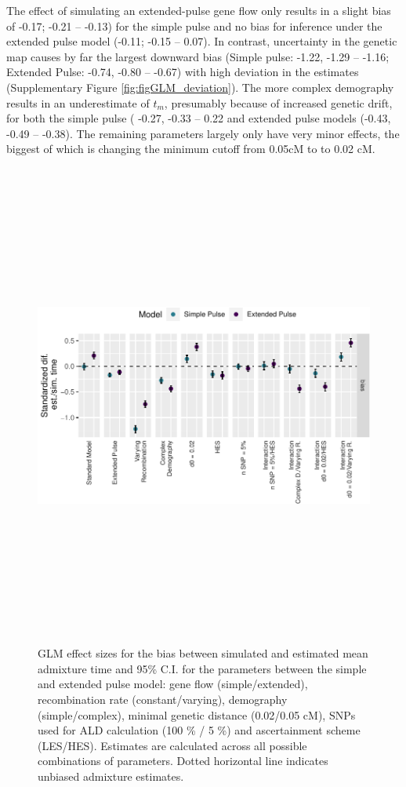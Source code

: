 \documentclass[11pt]{article}
\begin{document}
The effect of simulating an extended-pulse gene flow only results in a slight bias of -0.17; -0.21 -- -0.13) for the simple pulse and no bias for inference under the extended pulse model (-0.11; -0.15 -- 0.07). In contrast, uncertainty in the genetic map causes by far the largest downward bias (Simple pulse: -1.22, -1.29 -- -1.16; Extended Pulse: -0.74, -0.80 -- -0.67) with high deviation in the estimates (Supplementary Figure \ref{fig:figGLM_deviation}). The more complex demography results in an underestimate of $t_m$, presumably because of increased genetic drift, for both the simple pulse ( -0.27, -0.33 -- 0.22 and extended pulse models (-0.43, -0.49 -- -0.38). The remaining parameters largely only have very minor effects, the biggest of which is changing the minimum cutoff from 0.05cM to to 0.02 cM. 


\begin{figure}
\centering
\includegraphics[width=12cm,height=16cm,keepaspectratio]{Fig_4_MBE-21-0164_R1_Peter_Iasi.pdf}
\caption{\label{fig:figGLM} GLM effect sizes for the bias between simulated and estimated mean admixture time  and 95\% C.I. for the parameters between the simple and extended pulse model: gene flow (simple/extended), recombination rate (constant/varying), demography (simple/complex), minimal genetic distance (0.02/0.05 cM), SNPs used for ALD calculation (100 \% / 5 \%) and ascertainment scheme (LES/HES). Estimates are calculated across all possible combinations of parameters. Dotted horizontal line indicates unbiased admixture estimates.}
\end{figure}
\end{document}
